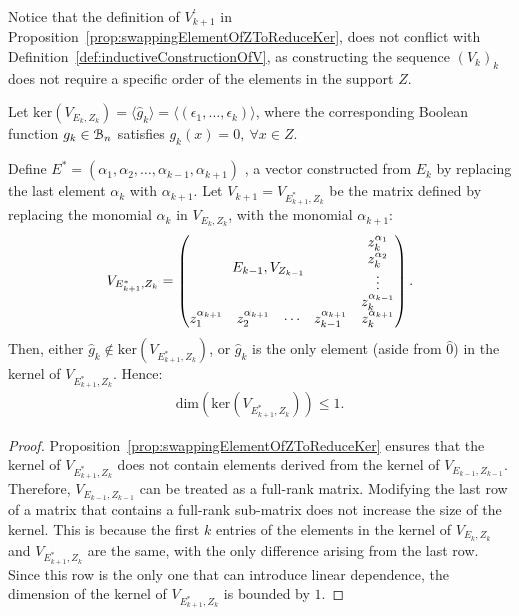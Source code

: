 \documentclass[11pt]{llncs}
\begin{document}
\begin{remark}
    Notice that the definition of $V^{'}_{k+1}$ in Proposition~\ref{prop:swappingElementOfZToReduceKer}, does not conflict with Definition~\ref{def:inductiveConstructionOfV}, as constructing the sequence $(V_{k})_k$ does not require a specific order of the elements in the support $Z$.   
\end{remark}




\begin{proposition}\label{prop:constructionOfNextVRemovingAlphai}
    Let $\text{ker}(V_{E_k, Z_k}) =  \langle \hat{g}_k \rangle = \langle (\epsilon_1, \dots, \epsilon_k) \rangle$, where the corresponding Boolean function $g_k\in \mathcal{B}_{n}$ satisfies $g_k(x) = 0,\ \forall x\in Z$.
    
    Define $E^{*} = (\alpha_1, \alpha_2, \dots, \alpha_{k-1}, \alpha_{k+1})$ , a vector constructed from $E_k$ by replacing the last element $\alpha_{k}$ with $\alpha_{k+1}$. 
    Let $V_{k+1} = V_{E^{*}_{k+1}, Z_k}$ be the matrix defined by replacing the monomial $\alpha_k$ in $V_{E_k, Z_k}$, with the monomial $\alpha_{k+1}$: 
    \begin{align*}
        V_{E^{*}_{k+1}, Z_{k}} = 
        \begin{pmatrix}
        \multicolumn{4}{c}{\multirow{4}{*}{$E_{k-1}, V_{Z_{k-1}}$}} & z_{k}^{\alpha_{1}}\\
        & & & & z_{k}^{\alpha_{2}}\\
        & & & & \vdots\\
        & & & & z_{k}^{\alpha_{k-1}}\\
        z_{1}^{\alpha_{k+1}} & z_{2}^{\alpha_{k+1}}& \cdots & z_{k-1}^{\alpha_{k+1}} & z_{k}^{\alpha_{k+1}}
    \end{pmatrix}.
    \end{align*}
    Then, either $\hat{g}_k \not\in \text{ker}(V_{E^{*}_{k+1}, Z_k})$, or $\hat{g}_k$ is the only element (aside from $\hat{0}$) in the kernel of $V_{E_{k+1}^{*}, Z_k}$. Hence:
    \begin{align*}
        \text{dim}\left(\text{ker}(V_{E^{*}_{k+1}, Z_k})\right)\leq 1. 
    \end{align*}

\end{proposition}

\begin{proof}
    Proposition~\ref{prop:swappingElementOfZToReduceKer} ensures that the kernel of $V_{E^{*}_{k+1}, Z_{k}}$ does not contain elements derived from the kernel of $V_{ E_{k-1}, Z_{k-1}}$. 
    Therefore, $V_{E_{k-1}, Z_{k-1}}$ can be treated as a full-rank matrix.
    Modifying the last row of a matrix that contains a full-rank sub-matrix does not increase the size of the kernel. This is because the first $k$ entries of the elements in the kernel of $V_{E_k, Z_k }$ and $V_{E^{*}_{k+1}, Z_k}$ are the same, with the only difference arising from the last row. 
    Since this row is the only one that can introduce linear dependence, the dimension of the kernel of $V_{ E^{*}_{k+1}, Z_k}$ is bounded by $1$.
\end{proof}
\end{document}
